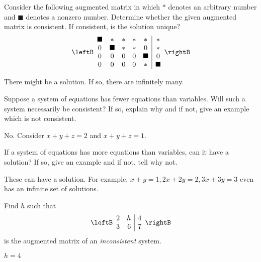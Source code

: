 \begin{enumialphparenastyle}
\begin{ex}
Consider the following augmented matrix in which $\ast $ denotes an arbitrary
number and $\blacksquare $ denotes a nonzero number. Determine whether the
given augmented matrix is consistent. If consistent, is the solution unique?
\begin{equation*}
\leftB
\begin{array}{ccccc|c}
\blacksquare & \ast & \ast & \ast & \ast & \ast \\
0 & \blacksquare & \ast & \ast & 0 & \ast \\
0 & 0 & 0 & 0 & \blacksquare & 0 \\
0 & 0 & 0 & 0 & \ast & \blacksquare
\end{array}
\rightB
\end{equation*}
\begin{sol}
There might be a solution. If so, there are infinitely many.
\end{sol}
\end{ex}

\begin{ex} 
Suppose a system of equations has fewer equations than variables. Will such a system necessarily be consistent? If so, explain why and if not, give an example
which is not consistent.
\begin{sol}
No. Consider $x+y+z=2$ and $x+y+z=1.$
\end{sol}
\end{ex}

\begin{ex}
If a system of equations has more equations than variables, can it
have a solution? If so, give an example and if not, tell why not.
\begin{sol}
These can
have a solution. For example, $x+y=1,2x+2y=2,3x+3y=3$ even has an infinite
set of solutions.
\end{sol}
\end{ex}

\begin{ex}
Find $h$ such that
\begin{equation*}
\leftB
\begin{array}{rr|r}
2 & h & 4 \\
3 & 6 & 7
\end{array}
\rightB
\end{equation*}
is the augmented matrix of an \textit{inconsistent} system.
\begin{sol}
$h=4$
\end{sol}
\end{ex}


\end{enumialphparenastyle}
